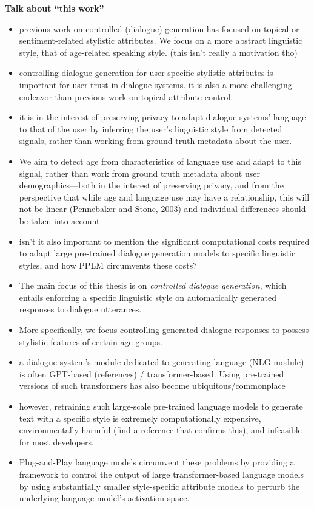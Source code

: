 \textbf{Talk about ``this work''}
\begin{itemize}
    \item previous work on controlled (dialogue) generation has focused on topical or sentiment-related stylistic attributes. We focus on a more abstract linguistic style, that of age-related speaking style. (this isn't really a motivation tho)
    \item controlling dialogue generation for user-specific stylistic attributes is important for user trust in dialogue systems. it is also a more challenging endeavor than previous work on topical attribute control. 
    \item it is in the interest of preserving privacy to adapt dialogue systems' language to that of the user by inferring the user's linguistic style from detected signals, rather than working from ground truth metadata about the user.
    \item We aim to detect age from characteristics of language use and adapt to this signal, rather than work from ground truth metadata about user demographics—both in the interest of preserving privacy, and from the perspective that while age and language use may have a relationship, this will not be linear (Pennebaker and Stone, 2003) and individual differences should be taken into account.
    \item isn't it also important to mention the significant computational costs required to adapt large pre-trained dialogue generation models to specific linguistic styles, and how PPLM circumvents these costs?
    \item The main focus of this thesis is on \textit{controlled dialogue generation}, which entails enforcing a specific linguistic style on automatically generated responses to dialogue utterances.
    \item More specifically, we focus controlling generated dialogue responses to possess stylistic features of certain age groups.
    \item a dialogue system's module dedicated to generating language (NLG module) is often GPT-based (references) / transformer-based. Using pre-trained versions of such transformers has also become ubiquitous/commonplace 
    \item however, retraining such large-scale pre-trained language models to generate text with a specific style is extremely computationally expensive, environmentally harmful (find a reference that confirms this), and infeasible for most developers.
    \item Plug-and-Play language models circumvent these problems by providing a framework to control the output of large transformer-based language models by using substantially smaller style-specific attribute models to perturb the underlying language model's activation space.

\end{itemize}
